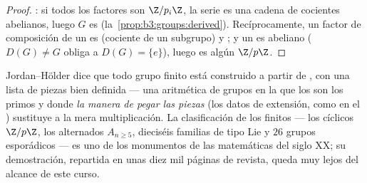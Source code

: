 \begin{proof}
: si todos los factores son
$\Z/p_i\Z$, la serie es una cadena de cocientes abelianos, luego $G$ es
(la~\cref{prop:b3:groups:derived}). Recíprocamente, un factor de
composición de un  es
 (cociente de un subgrupo) y
; y un
 es abeliano ($D(G) \ne G$
obliga a $D(G) = \{e\}$), luego es algún $\Z/p\Z$.
\end{proof}

\begin{remark}\label{rem:b3:groups:jhmeaning}
Jordan--Hölder dice que todo grupo finito está construido a partir de
, con una lista de piezas
bien definida --- una aritmética de grupos en la que los
 son los primos y donde
\emph{la manera de pegar las piezas} (los datos de extensión, como en el
) sustituye a la
mera multiplicación. La clasificación de los
 finitos --- los cíclicos
$\Z/p\Z$, los alternados $A_{n \geq
5}$, dieciséis familias de tipo Lie y $26$ grupos esporádicos --- es uno
de los monumentos de las matemáticas del siglo XX; su demostración,
repartida en unas diez mil páginas de revista, queda muy lejos del
alcance de este curso.
\end{remark}

